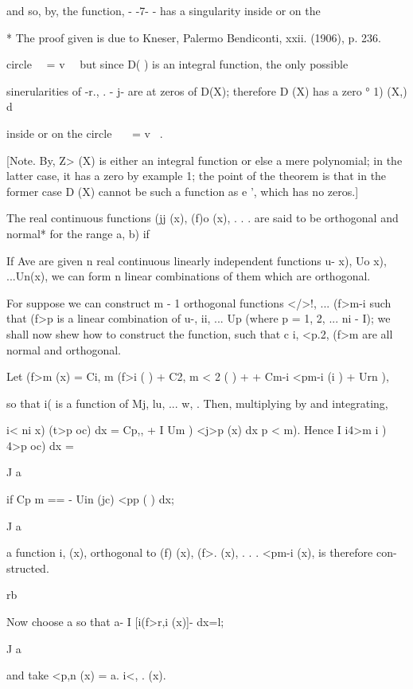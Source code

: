 {and so, by, the function, - -7- - has a singularity inside or
on the

* The proof given is due to Kneser, Palermo Bendiconti, xxii. (1906),
p. 236.

%
%

circle \ \ = v~ \ but since D( ) is an integral function, the only
possible

sinerularities of -r., . - j- are at zeros of D(X); therefore D (X)
has a zero ° 1) (X,) d\

inside or on the circle \ \ \ = v~ .

[Note. By, Z> (X) is either an integral function or else a
mere polynomial; in the latter case, it has a zero by example
1; the point of the theorem is that in the former case D (X) cannot
be such a function as e ', which has no zeros.]


The real continuous functions (jj (x), (f)o (x), . . . are said to be
orthogonal and normal* for the range a, b) if

If Ave are given n real continuous linearly independent functions u-
x), Uo x), ...Un(x), we can form n linear combinations of them which
are orthogonal.

For suppose we can construct m - 1 orthogonal functions </>!, ...
(f>m-i such that (f>p is a linear combination of u-, ii, ... Up
(where p = 1, 2, ... ni - I); we shall now shew how to construct the
function, such that c i, <p.2,  (f>m are all normal and
orthogonal.

Let (f>m (x) = Ci, m (f>i ( ) + C2, m < 2 ( ) +  + Cm-i <pm-i (i )
+ Urn ),

so that i( is a function of Mj, lu, ... w, . Then, multiplying by and
integrating,

i< ni x) (t>p oc) dx = Cp,, + I Um ) <j>p (x) dx p < m). Hence I i4>m
i ) 4>p oc) dx =

J a

if Cp m == - Uin (jc) <pp ( ) dx;

J a

a function i, (x), orthogonal to (f) (x), (f>. (x), . . . <pm-i (x),
is therefore con- structed.

rb

Now choose a so that a- I [i(f>r,i (x)]- dx=l;

J a

and take <p,n (x) = a. i<, . (x).

}
